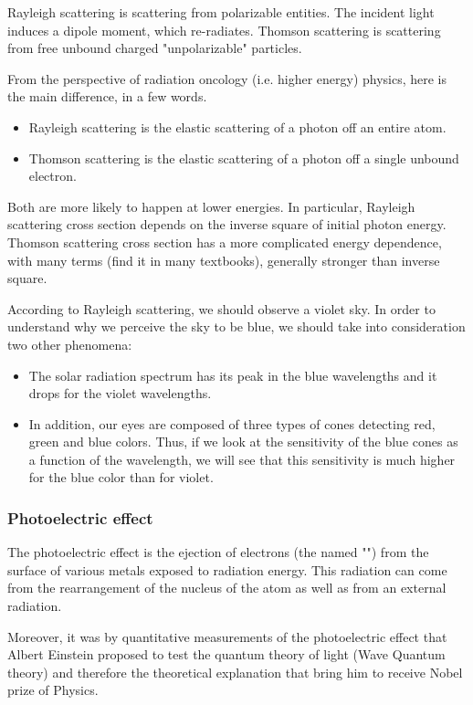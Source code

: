 	Rayleigh scattering is scattering from polarizable entities. The incident light induces a dipole moment, which re-radiates. Thomson scattering is scattering from free unbound charged "unpolarizable" particles.
	
	From the perspective of radiation oncology (i.e. higher energy) physics, here is the main difference, in a few words.
	\begin{itemize}
		\item Rayleigh scattering is the elastic scattering of a photon off an entire atom.

		\item Thomson scattering is the elastic scattering of a photon off a single unbound electron.
	\end{itemize}
	Both are more likely to happen at lower energies. In particular, Rayleigh scattering cross section depends on the inverse square of initial photon energy. Thomson scattering cross section has a more complicated energy dependence, with many terms (find it in many textbooks), generally stronger than inverse square.

	According to Rayleigh scattering, we should observe a violet sky. In order to understand why we perceive the sky to be blue, we should take into consideration two other phenomena:
	\begin{itemize}
		\item The solar radiation spectrum has its peak in the blue wavelengths and it drops for the violet wavelengths.

		\item In addition, our eyes are composed of three types of cones detecting red, green and blue colors. Thus, if we look at the sensitivity of the blue cones as a function of the wavelength, we will see that this sensitivity is much higher for the blue color than for violet. 
	\end{itemize}
	
	\subsubsection{Photoelectric effect}\label{photoelectric effect}
	The photoelectric effect is the ejection of electrons (the named "") from the surface of various metals exposed to radiation energy. This radiation can come from the rearrangement of the nucleus of the atom as well as from an external radiation.

	Moreover, it was by quantitative measurements of the photoelectric effect that Albert Einstein proposed to test the quantum theory of light (Wave Quantum theory) and therefore the theoretical explanation that bring him to receive Nobel prize of Physics.


